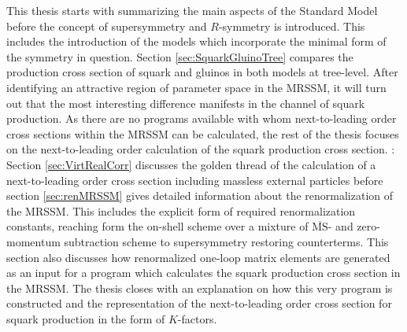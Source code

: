 This thesis starts with summarizing the main aspects of the Standard Model before the concept of supersymmetry and $R$-symmetry is introduced. This includes the introduction of the models which incorporate the minimal form of the symmetry in question. Section \ref{sec:SquarkGluinoTree} compares the production cross section of squark and gluinos in both models at \mbox{tree-level}. After identifying an attractive region of parameter space in the MRSSM, it will turn out that the most interesting difference manifests in the channel of squark production. As there are no programs available with whom next-to-leading order cross sections within the MRSSM can be calculated, the rest of the thesis focuses on the next-to-leading order calculation of the squark production cross section.
: Section \ref{sec:VirtRealCorr} discusses the golden thread of the calculation of a next-to-leading order cross section including massless external particles before section \ref{sec:renMRSSM} gives detailed information about the renormalization of the MRSSM. This includes the explicit form of required renormalization constants, reaching form the on-shell scheme over a mixture of $\overline{\mathrm{MS}}$- and zero-momentum subtraction scheme to supersymmetry restoring counterterms. This section also discusses how renormalized one-loop matrix elements are generated as an input for a program which calculates the squark production cross section in the MRSSM.
The thesis closes with an explanation on how this very program is constructed and the representation of the next-to-leading order cross section for squark production in the form of $K$-factors.

